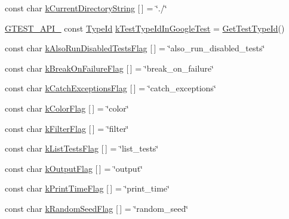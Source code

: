 \begin{DoxyCompactItemize}
\item 
const char \hyperlink{namespacetesting_1_1internal_a23a8e9527d0e544e7df2d64ad549ce3e}{k\+Current\+Directory\+String} \mbox{[}$\,$\mbox{]} = \char`\"{}./\char`\"{}
\item 
\hyperlink{gtest-port_8h_aa73be6f0ba4a7456180a94904ce17790}{G\+T\+E\+S\+T\+\_\+\+A\+P\+I\+\_\+} const \hyperlink{namespacetesting_1_1internal_ab1114197d3c657d8b7f8e0c5caa12d00}{Type\+Id} \hyperlink{namespacetesting_1_1internal_acac7993efabbd9dd62c1e9c7d143a72f}{k\+Test\+Type\+Id\+In\+Google\+Test} = \hyperlink{namespacetesting_1_1internal_ad0d66d56ead224263cd100c1d6bfc562}{Get\+Test\+Type\+Id}()
\item 
const char \hyperlink{namespacetesting_1_1internal_ad5882ed0ceadc0f23090f0f08b5d495b}{k\+Also\+Run\+Disabled\+Tests\+Flag} \mbox{[}$\,$\mbox{]} = \char`\"{}also\+\_\+run\+\_\+disabled\+\_\+tests\char`\"{}
\item 
const char \hyperlink{namespacetesting_1_1internal_a804c907155bfee3a6616ae3ca04048d0}{k\+Break\+On\+Failure\+Flag} \mbox{[}$\,$\mbox{]} = \char`\"{}break\+\_\+on\+\_\+failure\char`\"{}
\item 
const char \hyperlink{namespacetesting_1_1internal_af4bb309802e83df0927097e6e4201a38}{k\+Catch\+Exceptions\+Flag} \mbox{[}$\,$\mbox{]} = \char`\"{}catch\+\_\+exceptions\char`\"{}
\item 
const char \hyperlink{namespacetesting_1_1internal_a884ff13b75232fbe7daa0caf46f1de66}{k\+Color\+Flag} \mbox{[}$\,$\mbox{]} = \char`\"{}color\char`\"{}
\item 
const char \hyperlink{namespacetesting_1_1internal_a8cb8ee7fe7659e6916a0108dffa2f7dc}{k\+Filter\+Flag} \mbox{[}$\,$\mbox{]} = \char`\"{}filter\char`\"{}
\item 
const char \hyperlink{namespacetesting_1_1internal_a1d3cfebffefbf35f7033d4941493a8ff}{k\+List\+Tests\+Flag} \mbox{[}$\,$\mbox{]} = \char`\"{}list\+\_\+tests\char`\"{}
\item 
const char \hyperlink{namespacetesting_1_1internal_abd5368e00a31d175c6696cf76cbbde10}{k\+Output\+Flag} \mbox{[}$\,$\mbox{]} = \char`\"{}output\char`\"{}
\item 
const char \hyperlink{namespacetesting_1_1internal_aa6c13109bb4c78740ddb082b1ec0de56}{k\+Print\+Time\+Flag} \mbox{[}$\,$\mbox{]} = \char`\"{}print\+\_\+time\char`\"{}
\item 
const char \hyperlink{namespacetesting_1_1internal_a964ad71443cfda304b3208bf5d2daa75}{k\+Random\+Seed\+Flag} \mbox{[}$\,$\mbox{]} = \char`\"{}random\+\_\+seed\char`\"{}

\end{DoxyCompactItemize}

